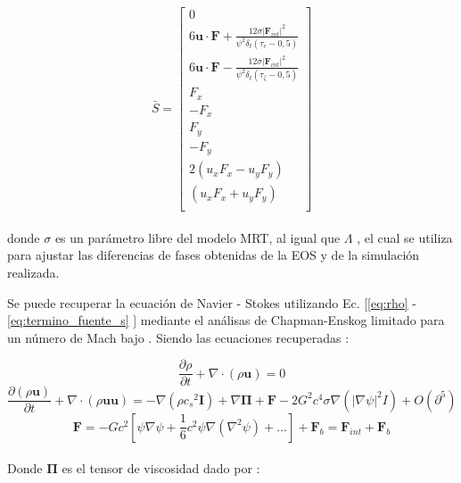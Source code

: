 \begin{equation}
    \bar{S} = 
    \left[ \begin{array}{c} 
        0\\
        6 \mathbf{u}\cdot \mathbf{F} + \frac{12 \sigma {|{\mathbf{F}_{int}|}}^{2} }{{\psi}^{2} \delta_{t} (\tau_{e} - 0,5)}\\
        6 \mathbf{u}\cdot \mathbf{F} - \frac{12 \sigma {|{\mathbf{F}_{int}|}}^{2} }{{\psi}^{2} \delta_{t} (\tau_{\zeta } - 0,5)}\\
        F_{x}\\
        -F_{x}\\
        F_{y}\\
        -F_{y}\\
        2(u_{x} F_{x} - u_{y} F_{y} )\\
        (u_{x} F_{x} + u_{y} F_{y} )\\              
    \end{array}
    \right]    
    \label{eq:termino_fuente_s}
\end{equation}
\\
donde $\sigma$ es un parámetro libre del modelo MRT, al igual que $\Lambda$ , el cual se utiliza para ajustar las diferencias de fases obtenidas de la EOS y de la simulación realizada.

Se puede recuperar la ecuación de Navier - Stokes utilizando Ec. [\ref{eq:rho} - \ref{eq:termino_fuente_s} ] mediante el análisas de Chapman-Enskog limitado para un número de Mach bajo \cite{li2013lattice}. Siendo las ecuaciones recuperadas \cite{fogliatto2019simulation} \cite{li2013lattice}:

\begin{equation}
	\frac{\partial \rho }{\partial t}  + \nabla \cdot \left( \rho \mathbf{u} \right) = 0
\end{equation}
\begin{equation}
	\frac{\partial \left( \rho \mathbf{u}\right)}{\partial t} + \nabla \cdot \left( \rho \mathbf{u} \mathbf{u}\right) = - \nabla \left( \rho {c_{s}}^{2} \mathbf{I} \right) + \nabla \mathbf{\Pi} + \mathbf{F} - 2 G^{2} c^{4} \sigma \nabla \left( {|\nabla \psi	|}^{2} I	\right) + O (\partial^{5})
\end{equation}
\begin{equation}
\mathbf{F} = - G c^{2} \left[	\psi \nabla \psi + \frac{1}{6} c^{2} \psi \nabla \left( \nabla^{2} \psi\right) + ...\right] + \mathbf{F}_{b} = \mathbf{F}_{int} + \mathbf{F}_{b}
\end{equation}
\\
Donde $\mathbf{\Pi}$ es el tensor de viscosidad dado por :

